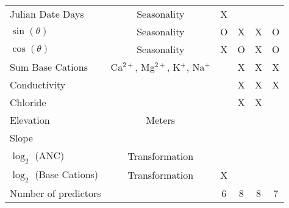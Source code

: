 \begin{table}[htbp]
\begin{tabular}{lccccc}
Julian Date Days           &Seasonality & X                                                     &                                                     &                                                                &  \\ 
$\sin(\theta)$                &Seasonality & O                                                  & X                                                   & X                                                            & O \\ 
$\cos(\theta)$               &Seasonality & X                                                  & O                                                  & X                                                             & O \\ 
Sum Base Cations          & Ca$^{2+}$, Mg$^{2+}$, K$^+$, Na$^+$                   &                                                     & X                                                   & X                                                             & X \\ 
Conductivity                  &                   &                                                     & X                                                    & X                                                            & X \\ 
Chloride                         &                   &                                                     & X                                                    & X                                                            &  \\ 
Elevation              &Meters                  &                                                     &                                                      &                                                                &  \\ 
Slope                               &                 &                                                     &                                                      &                                                                &  \\ 
$\log_2$ (ANC)               &Transformation                 &                                                     &                                                      &                                                                &  \\ 
$\log_2$ (Base Cations) &Transformation                  & X                                                 &                                                      &                                                                &  \\ \hline\noalign{\smallskip}
Number of predictors      &                 & 6                                                  & 8                                                   & 8                                                            & 7 \\ 
\bottomrule
\end{tabular}
\label{tab:variables}
\end{table}